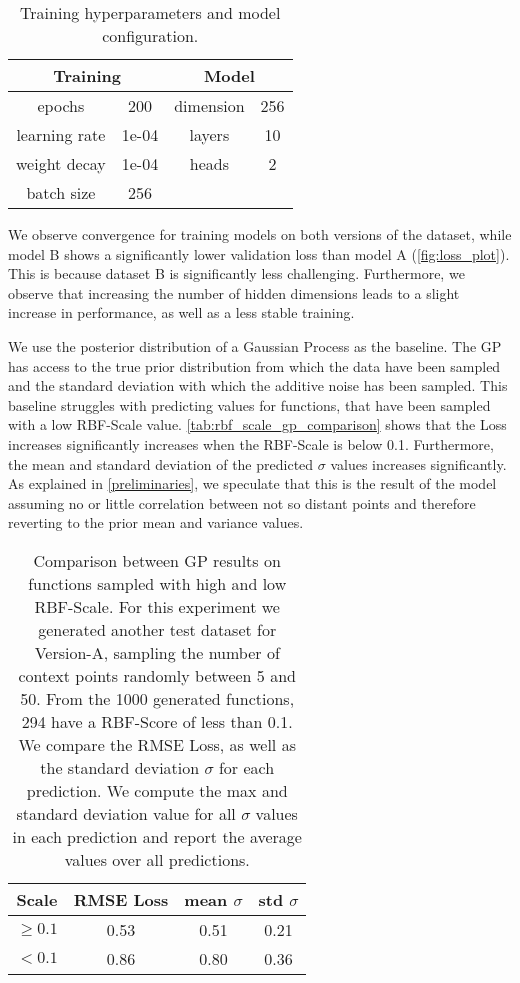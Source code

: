 \begin{table}[]
	\centering
	\caption{Training hyperparameters and model configuration.}
	\begin{tabular}{c c c c}
		\toprule
		\multicolumn{2}{c}{Training} & \multicolumn{2}{c}{Model} \\
		\midrule
		epochs & 200 & dimension & 256 \\
		learning rate & 1e-04 & layers & 10\\
		weight decay & 1e-04 & heads & 2  \\
		batch size & 256 & \\\bottomrule
	\end{tabular}
	\label{tab:hyperparams}
\end{table}

We observe convergence for training models on both versions of the dataset, while model B shows a significantly lower validation loss than model A (\autoref{fig:loss_plot}). This is because dataset B is significantly less challenging. Furthermore, we observe that increasing the number of hidden dimensions leads to a slight increase in performance, as well as a less stable training.

We use the posterior distribution of a Gaussian Process as the baseline. The GP has access to the true prior distribution from which the data have been sampled and the standard deviation with which the additive noise has been sampled. This baseline struggles with predicting values for functions, that have been sampled with a low RBF-Scale value. \autoref{tab:rbf_scale_gp_comparison} shows that the Loss increases significantly increases when the RBF-Scale is below 0.1. Furthermore, the mean and standard deviation of the predicted $\sigma$ values increases significantly. As explained in \autoref{preliminaries}, we speculate that this is the result of the model assuming no or little correlation between not so distant points and therefore reverting to the prior mean and variance values.

\begin{table}[]
	\centering
	\caption{Comparison between GP results on functions sampled with high and low RBF-Scale. For this experiment we generated another test dataset for Version-A, sampling the number of context points randomly between 5 and 50. From the 1000 generated functions, 294 have a RBF-Score of less than 0.1. We compare the RMSE Loss, as well as the standard deviation $\sigma$ for each prediction. We compute the max and standard deviation value for all $\sigma$ values in each prediction and report the average values over all predictions.}
	\begin{tabular}{c c c c}
		\toprule
		Scale & RMSE Loss & mean $\sigma$ & std $\sigma$\\
		\midrule
		$\geq 0.1$ & 0.53 & 0.51 & 0.21\\
		$< 0.1$ & 0.86 & 0.80 & 0.36\\\bottomrule
	\end{tabular}
	\label{tab:rbf_scale_gp_comparison}
\end{table}


